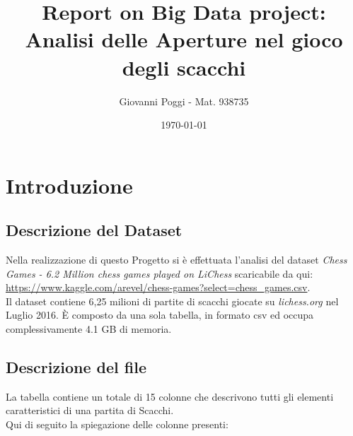 \documentclass[10pt]{article}
\title{\textbf{Report on Big Data project: \\Analisi delle Aperture nel gioco degli scacchi}}
\author{
	Giovanni Poggi - Mat. 938735}
\date{\today}
\begin{document}
\maketitle
\newpage

\tableofcontents

\newpage

\section{Introduzione}

\subsection{Descrizione del Dataset}

Nella realizzazione di questo Progetto si \`e effettuata l'analisi del dataset \textit{Chess Games - 6.2 Million chess games played on LiChess} scaricabile da qui: \url{https://www.kaggle.com/arevel/chess-games?select=chess_games.csv}.\\Il dataset contiene 6,25 milioni di partite di scacchi giocate su \textit{lichess.org} nel Luglio 2016. \`E composto da una sola tabella, in formato csv ed occupa complessivamente 4.1 GB di memoria.

\subsection{Descrizione del file}

La tabella contiene un totale di 15 colonne che descrivono tutti gli elementi caratteristici di una partita di Scacchi.\\Qui di seguito la spiegazione delle colonne presenti:
\end{document}

